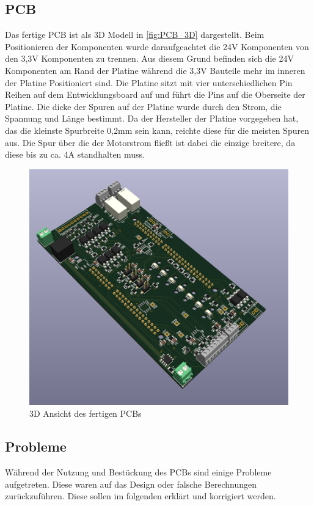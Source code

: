 \subsection{\ac{PCB}}
Das fertige PCB ist als 3D Modell in \autoref{fig:PCB_3D} dargestellt. Beim Positionieren der Komponenten wurde daraufgeachtet die 24V Komponenten von den 3,3V Komponenten zu trennen. Aus diesem Grund befinden sich die 24V Komponenten am Rand der Platine während die 3,3V Bauteile mehr im inneren der Platine Positioniert sind. Die Platine sitzt mit vier unterschiedlichen Pin Reihen auf dem Entwicklungsboard auf und führt die Pins auf die Oberseite der Platine. Die dicke der Spuren auf der Platine wurde durch den Strom, die Spannung und Länge bestimmt. Da der Hersteller der Platine vorgegeben hat, das die kleinste Spurbreite 0,2mm sein kann, reichte diese für die meisten Spuren aus. Die Spur über die der Motorstrom fließt ist dabei die einzige breitere, da diese bis zu ca. 4A standhalten muss.
\begin{figure}[H]
	\centering
	\includegraphics[width=1.0\textwidth]{images/Hardware/Platine_Fertig_3D_ansicht(1).PNG}
	\caption{3D Ansicht des fertigen PCBs}
	\label{fig:PCB_3D}
\end{figure}


\subsection{Probleme}
Während der Nutzung und Bestückung des \ac{PCB}s sind einige Probleme aufgetreten. Diese waren auf das Design oder falsche Berechnungen zurückzuführen. Diese sollen im folgenden erklärt und korrigiert werden.
